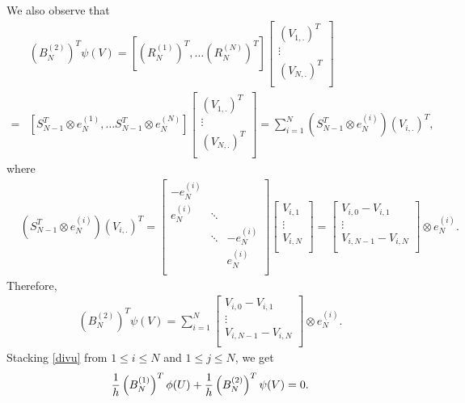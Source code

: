 \documentclass[english]{pkupaper}
\newenvironment{eqt}{\begin{equation}\begin{aligned}}{\end{aligned}\end{equation}}
\begin{document}
We also observe that
\begin{eqt}
&(B_N^{(2)})^T\psi(V)=\left[(R_N^{(1)})^T, \dots (R_N^{(N)})^T\right]\begin{bmatrix}
(V_{1,.})^T\\
\vdots\\
(V_{N,.})^T\\
\end{bmatrix}\\
=&\left[S_{N-1}^T\otimes e_N^{(1)}, \dots S_{N-1}^T\otimes e_N^{(N)}\right]\begin{bmatrix}
(V_{1,.})^T\\
\vdots\\
(V_{N,.})^T\\
\end{bmatrix}=\sum_{i=1}^N\left(S_{N-1}^T\otimes e_N^{(i)}\right)(V_{i,.})^T,
\end{eqt}
where
\begin{eqt}
&\left(S_{N-1}^T\otimes e_N^{(i)}\right)(V_{i,.})^T
=\begin{bmatrix}
-e_N^{(i)}\\
e_N^{(i)}&\ddots\\
&\ddots&-e_N^{(i)}\\
&&e_N^{(i)}\\
\end{bmatrix}
\begin{bmatrix}
V_{i,1}\\
\vdots\\
V_{i,N}\\
\end{bmatrix}=\begin{bmatrix}
V_{i,0}-V_{i,1}\\
\vdots\\
V_{i,N-1}-V_{i,N}\\
\end{bmatrix}\otimes e_N^{(i)}.
\end{eqt}
Therefore, 
\begin{eqt}
\label{bn2t}
(B_N^{(2)})^T\psi(V)=\sum_{i=1}^N\begin{bmatrix}
V_{i,0}-V_{i,1}\\
\vdots\\
V_{i,N-1}-V_{i,N}\\
\end{bmatrix}\otimes e_N^{(i)}.
\end{eqt}
Stacking \ref{divu} from $1\leq i\leq N$ and $1\leq j\leq N$, we get
\begin{eqt}
\frac{1}{h}\lp B_N^{(1)}\rp^T\phi(U)+\frac{1}{h}\lp B_N^{(2)}\rp^T\psi(V)=0.
\end{eqt}
\end{document}
